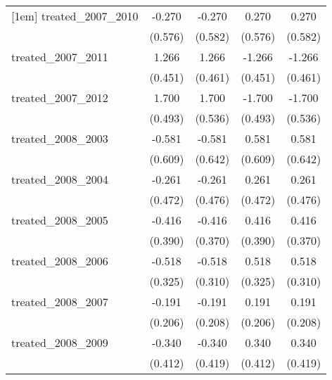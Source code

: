 {\begin{tabular}{l*{4}{c}}
[1em]
treated\_2007\_2010&      -0.270         &      -0.270         &       0.270         &       0.270         \\
            &     (0.576)         &     (0.582)         &     (0.576)         &     (0.582)         \\
[1em]
treated\_2007\_2011&       1.266\sym{**} &       1.266\sym{**} &      -1.266\sym{**} &      -1.266\sym{**} \\
            &     (0.451)         &     (0.461)         &     (0.451)         &     (0.461)         \\
[1em]
treated\_2007\_2012&       1.700\sym{***}&       1.700\sym{**} &      -1.700\sym{***}&      -1.700\sym{**} \\
            &     (0.493)         &     (0.536)         &     (0.493)         &     (0.536)         \\
[1em]
treated\_2008\_2003&      -0.581         &      -0.581         &       0.581         &       0.581         \\
            &     (0.609)         &     (0.642)         &     (0.609)         &     (0.642)         \\
[1em]
treated\_2008\_2004&      -0.261         &      -0.261         &       0.261         &       0.261         \\
            &     (0.472)         &     (0.476)         &     (0.472)         &     (0.476)         \\
[1em]
treated\_2008\_2005&      -0.416         &      -0.416         &       0.416         &       0.416         \\
            &     (0.390)         &     (0.370)         &     (0.390)         &     (0.370)         \\
[1em]
treated\_2008\_2006&      -0.518         &      -0.518         &       0.518         &       0.518         \\
            &     (0.325)         &     (0.310)         &     (0.325)         &     (0.310)         \\
[1em]
treated\_2008\_2007&      -0.191         &      -0.191         &       0.191         &       0.191         \\
            &     (0.206)         &     (0.208)         &     (0.206)         &     (0.208)         \\
[1em]
treated\_2008\_2009&      -0.340         &      -0.340         &       0.340         &       0.340         \\
            &     (0.412)         &     (0.419)         &     (0.412)         &     (0.419)         \\

\end{tabular}}
